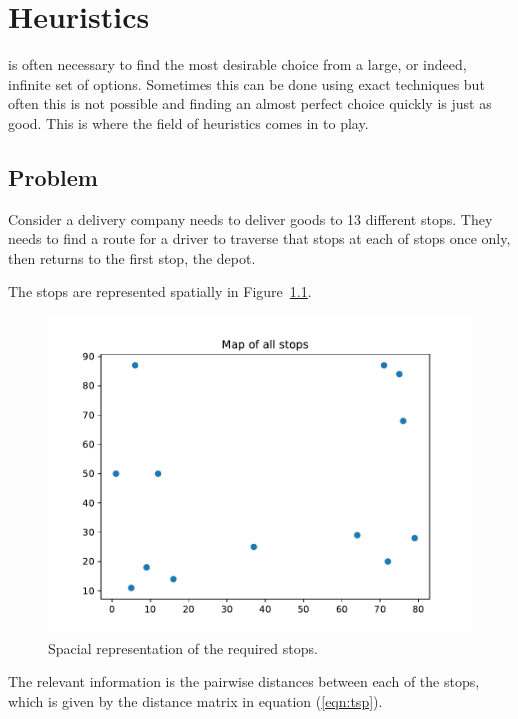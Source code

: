 \chapter[Heuristics]{Heuristics}

 is often necessary to find the most desirable choice from
a large, or indeed, infinite set of options. Sometimes this can be done using
exact techniques but often this is not possible and finding an almost perfect
choice quickly is just as good. This is where the field of heuristics comes in
to play.

\section{Problem}\label{sec:problem}

Consider a delivery company needs to deliver goods to 13 different stops.
They needs to find a route for a driver to traverse that stops at each of stops
once only, then returns to the first stop, the depot.

The stops are represented spatially in Figure~\ref{fig:tsp}.

\begin{figure}
    \begin{center}
        \includegraphics[width=.8\textwidth]{./assets/tsp/main.pdf}
    \end{center}
    \caption{Spacial representation of the required stops.}
    \label{fig:tsp}
\end{figure}

The relevant information is the pairwise distances between each of the stops,
which is given by the distance matrix in equation (\ref{eqn:tsp}).

\tiny{
    
}
\normalsize

